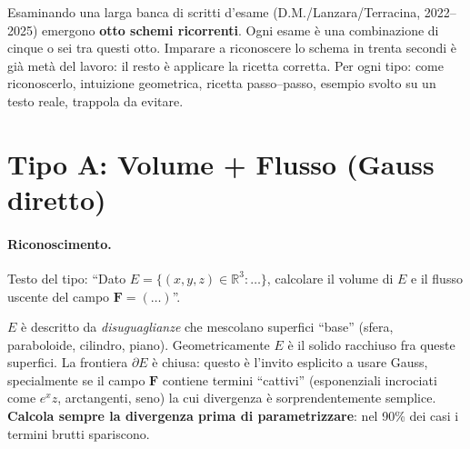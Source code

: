 \documentclass[11pt,a4paper,openany]{book}
\theoremstyle{plain}
\theoremstyle{definition}
\theoremstyle{remark}
\newcommand{\R}{\mathbb{R}}
\newcommand{\F}{\mathbf{F}}
\begin{document}
Esaminando una larga banca di scritti d'esame (D.M.{}/Lanzara/Terracina,
2022--2025) emergono \textbf{otto schemi ricorrenti}. Ogni esame \`e
una combinazione di cinque o sei tra questi otto. Imparare a riconoscere
lo schema in trenta secondi \`e gi\`a met\`a del lavoro: il resto \`e
applicare la ricetta corretta. Per ogni tipo: come riconoscerlo,
intuizione geometrica, ricetta passo--passo, esempio svolto su un testo
reale, trappola da evitare.

\section{Tipo A: Volume + Flusso (Gauss diretto)}

\paragraph{Riconoscimento.} Testo del tipo:
``Dato $E=\{(x,y,z)\in\R^3:\dots\}$, calcolare il volume di $E$ e il
flusso uscente del campo $\F=(\dots)$''.

\begin{nota}[title={Intuizione}]
$E$ \`e descritto da \emph{disuguaglianze} che mescolano superfici
``base'' (sfera, paraboloide, cilindro, piano). Geometricamente
$E$ \`e il solido racchiuso fra queste superfici. La frontiera
$\partial E$ \`e chiusa: questo \`e l'invito esplicito a usare Gauss,
specialmente se il campo $\F$ contiene termini ``cattivi'' (esponenziali
incrociati come $e^xz$, arctangenti, seno) la cui divergenza \`e
sorprendentemente semplice. \textbf{Calcola sempre la divergenza
prima di parametrizzare}: nel 90\% dei casi i termini brutti spariscono.
\end{nota}
\end{document}
